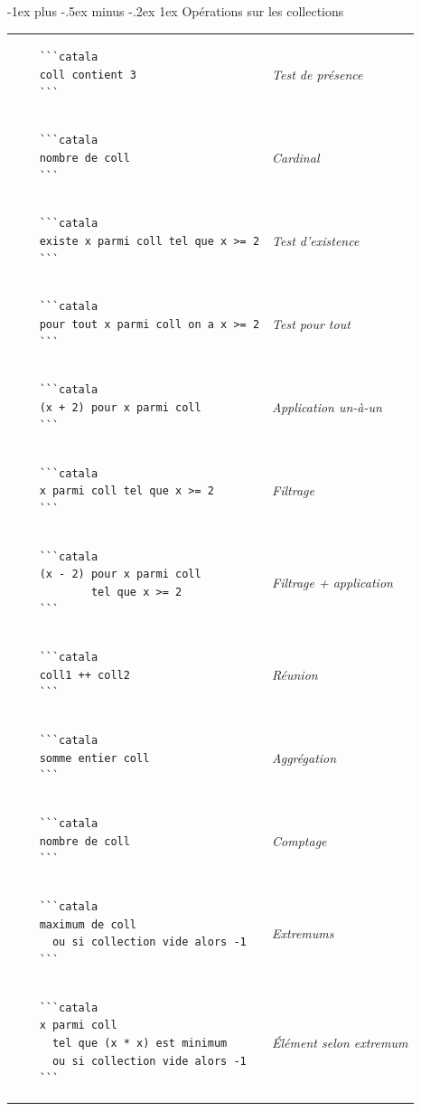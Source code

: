 \documentclass{article}
\makeatletter
\newcommand\articlenormalsize{\fontsize{10pt}{12pt}\selectfont}
\renewcommand{\section}{\@startsection{section}{1}{0mm}%
                                {-1ex plus -.5ex minus -.2ex}%
                                {1ex}%
                                {\normalfont\articlenormalsize\bfseries}}
\newenvironment{catala}{%
  \VerbatimEnvironment
  \let\FV@ListVSpace\relax
  \begin{verbatim}}%
 {\end{verbatim}}
\makeatother
\begin{document}
\begin{multicols}{3}
\section{Opérations sur les collections}

\begin{tabular}{@{}p{\cola}>{\slshape}p{\colb}@{}}
  \begin{catala}
    ```catala
    coll contient 3
    ```
  \end{catala}
  & Test de présence
  \\
  \begin{catala}
    ```catala
    nombre de coll
    ```
  \end{catala}
  & Cardinal
  \\
  \begin{catala}
    ```catala
    existe x parmi coll tel que x >= 2
    ```
  \end{catala}
  & Test d'existence
  \\
  \begin{catala}
    ```catala
    pour tout x parmi coll on a x >= 2
    ```
  \end{catala}
  & Test pour tout
  \\
  \begin{catala}
    ```catala
    (x + 2) pour x parmi coll
    ```
  \end{catala}
  & Application un-à-un
  \\
  \begin{catala}
    ```catala
    x parmi coll tel que x >= 2
    ```
  \end{catala}
  & Filtrage
  \\
  \begin{catala}
    ```catala
    (x - 2) pour x parmi coll
            tel que x >= 2
    ```
  \end{catala}
  & Filtrage + application
  \\
  \begin{catala}
    ```catala
    coll1 ++ coll2
    ```
  \end{catala}
  & Réunion
  \\
  \begin{catala}
    ```catala
    somme entier coll
    ```
  \end{catala}
  & Aggrégation
  \\
  \begin{catala}
    ```catala
    nombre de coll
    ```
  \end{catala}
  & Comptage
  \\
  \begin{catala}
    ```catala
    maximum de coll
      ou si collection vide alors -1
    ```
  \end{catala}
  & Extremums
  \\
  \begin{catala}
    ```catala
    x parmi coll
      tel que (x * x) est minimum
      ou si collection vide alors -1
    ```
  \end{catala}
  & Élément selon extremum
  \\
\end{tabular}

\end{multicols}
\end{document}
